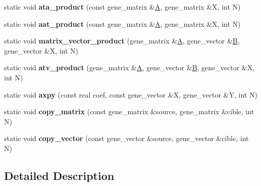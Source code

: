 \begin{DoxyCompactItemize}
\item 
\mbox{\label{classblitz__interface_ab0c6a929cabf395e90a7e699fb0780f6}} 
static void {\bfseries ata\+\_\+product} (const gene\+\_\+matrix \&\hyperlink{group___core___module_class_eigen_1_1_matrix}{A}, gene\+\_\+matrix \&X, int N)
\item 
\mbox{\label{classblitz__interface_a315fc012f5b096941c22cd87e3f36f7f}} 
static void {\bfseries aat\+\_\+product} (const gene\+\_\+matrix \&\hyperlink{group___core___module_class_eigen_1_1_matrix}{A}, gene\+\_\+matrix \&X, int N)
\item 
\mbox{\label{classblitz__interface_ac4ee2d4264040c22fda37ab6fdc3218d}} 
static void {\bfseries matrix\+\_\+vector\+\_\+product} (gene\+\_\+matrix \&\hyperlink{group___core___module_class_eigen_1_1_matrix}{A}, gene\+\_\+vector \&\hyperlink{group___core___module_class_eigen_1_1_matrix}{B}, gene\+\_\+vector \&X, int N)
\item 
\mbox{\label{classblitz__interface_a5a4a55988c97500c67bea493f813f221}} 
static void {\bfseries atv\+\_\+product} (gene\+\_\+matrix \&\hyperlink{group___core___module_class_eigen_1_1_matrix}{A}, gene\+\_\+vector \&\hyperlink{group___core___module_class_eigen_1_1_matrix}{B}, gene\+\_\+vector \&X, int N)
\item 
\mbox{\label{classblitz__interface_a1b896d7260ddb53711096374c0491f6c}} 
static void {\bfseries axpy} (const real coef, const gene\+\_\+vector \&X, gene\+\_\+vector \&Y, int N)
\item 
\mbox{\label{classblitz__interface_aca1bec53d9614d9fd7ff2df1a95b7965}} 
static void {\bfseries copy\+\_\+matrix} (const gene\+\_\+matrix \&source, gene\+\_\+matrix \&cible, int N)
\item 
\mbox{\label{classblitz__interface_a8aea6723caaf492cf66f34b7eeff3a55}} 
static void {\bfseries copy\+\_\+vector} (const gene\+\_\+vector \&source, gene\+\_\+vector \&cible, int N)
\end{DoxyCompactItemize}


\subsection{Detailed Description}
